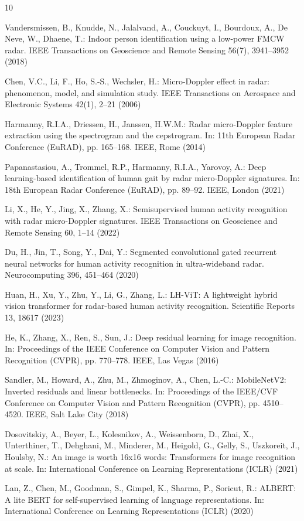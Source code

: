 \documentclass{svproc}
\begin{document}
\begin{thebibliography}{10}

Vandersmissen, B., Knudde, N., Jalalvand, A., Couckuyt, I., Bourdoux, A., De Neve, W., Dhaene, T.: Indoor person identification using a low-power FMCW radar. IEEE Transactions on Geoscience and Remote Sensing 56(7), 3941--3952 (2018)

Chen, V.C., Li, F., Ho, S.-S., Wechsler, H.: Micro-Doppler effect in radar: phenomenon, model, and simulation study. IEEE Transactions on Aerospace and Electronic Systems 42(1), 2--21 (2006)

Harmanny, R.I.A., Driessen, H., Janssen, H.W.M.: Radar micro-Doppler feature extraction using the spectrogram and the cepstrogram. In: 11th European Radar Conference (EuRAD), pp. 165--168. IEEE, Rome (2014)

Papanastasiou, A., Trommel, R.P., Harmanny, R.I.A., Yarovoy, A.: Deep learning-based identification of human gait by radar micro-Doppler signatures. In: 18th European Radar Conference (EuRAD), pp. 89--92. IEEE, London (2021)

Li, X., He, Y., Jing, X., Zhang, X.: Semisupervised human activity recognition with radar micro-Doppler signatures. IEEE Transactions on Geoscience and Remote Sensing 60, 1--14 (2022)

Du, H., Jin, T., Song, Y., Dai, Y.: Segmented convolutional gated recurrent neural networks for human activity recognition in ultra-wideband radar. Neurocomputing 396, 451--464 (2020)

Huan, H., Xu, Y., Zhu, Y., Li, G., Zhang, L.: LH-ViT: A lightweight hybrid vision transformer for radar-based human activity recognition. Scientific Reports 13, 18617 (2023)

He, K., Zhang, X., Ren, S., Sun, J.: Deep residual learning for image recognition. In: Proceedings of the IEEE Conference on Computer Vision and Pattern Recognition (CVPR), pp. 770--778. IEEE, Las Vegas (2016)

Sandler, M., Howard, A., Zhu, M., Zhmoginov, A., Chen, L.-C.: MobileNetV2: Inverted residuals and linear bottlenecks. In: Proceedings of the IEEE/CVF Conference on Computer Vision and Pattern Recognition (CVPR), pp. 4510--4520. IEEE, Salt Lake City (2018)

Dosovitskiy, A., Beyer, L., Kolesnikov, A., Weissenborn, D., Zhai, X., Unterthiner, T., Dehghani, M., Minderer, M., Heigold, G., Gelly, S., Uszkoreit, J., Houlsby, N.: An image is worth 16x16 words: Transformers for image recognition at scale. In: International Conference on Learning Representations (ICLR) (2021)

Lan, Z., Chen, M., Goodman, S., Gimpel, K., Sharma, P., Soricut, R.: ALBERT: A lite BERT for self-supervised learning of language representations. In: International Conference on Learning Representations (ICLR) (2020)

\end{thebibliography}
\end{document}

